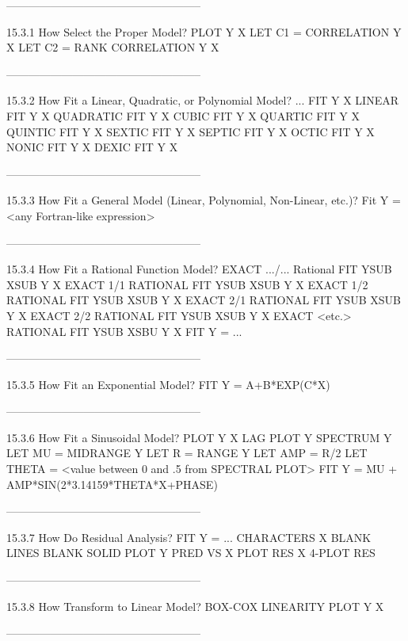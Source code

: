-----------------------------------------------------
 
15.3.1
How Select the Proper Model?
      PLOT Y X
      LET C1 = CORRELATION Y X
      LET C2 = RANK CORRELATION Y X
 
-----------------------------------------------------
 
15.3.2
How Fit a Linear, Quadratic, or Polynomial Model?
      ... FIT Y X
         LINEAR FIT Y X
         QUADRATIC FIT Y X
         CUBIC FIT Y X
         QUARTIC FIT Y X
         QUINTIC FIT Y X
         SEXTIC FIT Y X
         SEPTIC FIT Y X
         OCTIC FIT Y X
         NONIC FIT Y X
         DEXIC FIT Y X
 
-----------------------------------------------------
 
15.3.3
How Fit a General Model (Linear, Polynomial, Non-Linear, etc.)?
      Fit Y = <any Fortran-like expression>
 
-----------------------------------------------------
 
15.3.4
How Fit a Rational Function Model?
      EXACT .../... Rational FIT YSUB XSUB Y X
         EXACT 1/1 RATIONAL FIT YSUB XSUB Y X
         EXACT 1/2 RATIONAL FIT YSUB XSUB Y X
         EXACT 2/1 RATIONAL FIT YSUB XSUB Y X
         EXACT 2/2 RATIONAL FIT YSUB XSUB Y X
         EXACT <etc.> RATIONAL FIT YSUB XSBU Y X
      FIT Y = ...
 
-----------------------------------------------------
 
15.3.5
How Fit an Exponential Model?
      FIT Y = A+B*EXP(C*X)
 
-----------------------------------------------------
 
15.3.6
How Fit a Sinusoidal Model?
      PLOT Y X
      LAG PLOT Y
      SPECTRUM Y
      LET MU = MIDRANGE Y
      LET R = RANGE Y
      LET AMP = R/2
      LET THETA = <value between 0 and .5 from SPECTRAL PLOT>
      FIT Y = MU + AMP*SIN(2*3.14159*THETA*X+PHASE)
 
-----------------------------------------------------
 
15.3.7
How Do Residual Analysis?
      FIT Y = ...
      CHARACTERS X BLANK
      LINES BLANK SOLID
      PLOT Y PRED VS X
      PLOT RES X
      4-PLOT RES
 
-----------------------------------------------------
 
15.3.8
How Transform to Linear Model?
      BOX-COX LINEARITY PLOT Y X
 
-----------------------------------------------------
 
